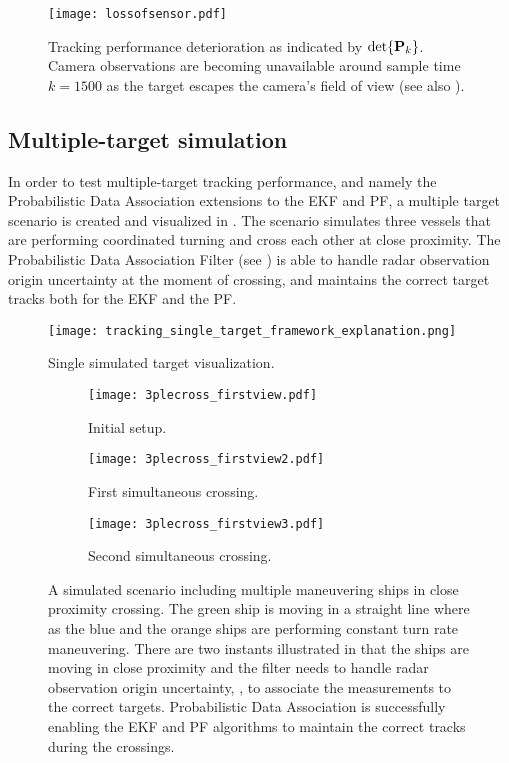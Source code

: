 \begin{figure}
	\centering
	\texttt{[image: lossofsensor.pdf]}
	\caption{Tracking performance deterioration as indicated by $\det{\P_k}$. Camera observations are becoming unavailable around sample time $k=1500$ as the target escapes the camera's field of view (see also ).}
	\label{fig:lossofcamera}
\end{figure}



\subsection{Multiple-target simulation}
In order to test multiple-target tracking performance, and namely the Probabilistic Data Association extensions to the EKF and PF, a multiple target scenario is created and visualized in . The scenario simulates three vessels that are performing coordinated turning and cross each other at close proximity. The Probabilistic Data Association Filter (see ) is able to handle radar observation origin uncertainty at the moment of crossing, and maintains the correct target tracks both for the EKF and the PF. 

\begin{figure}[H]
	\centering
	\texttt{[image: tracking\_single\_target\_framework\_explanation.png]}
	\caption{Single simulated target visualization.}
	\label{fig:simulatorsingle}
\end{figure}

\begin{figure}[H]
	\begin{subfigure}[b]{.5\textwidth}
		\centering
		\texttt{[image: 3plecross\_firstview.pdf]}
		\caption{Initial setup.}
		\label{fig:multiTrack1}
	\end{subfigure}\hfill
	\begin{subfigure}[b]{.5\textwidth}
		\centering
		\texttt{[image: 3plecross\_firstview2.pdf]}
		\caption{First simultaneous crossing.}
		\label{fig:multiTrack2}
	\end{subfigure}\hfill
	\begin{subfigure}[b]{1.0\textwidth}
		\centering
		\texttt{[image: 3plecross\_firstview3.pdf]}
		\caption{Second simultaneous crossing.}
		\label{fig:multiTrack3}
	\end{subfigure}\hfill
	\caption{A simulated scenario including multiple maneuvering ships in close proximity crossing. The green ship is moving in a straight line where as the blue and the orange ships are performing constant turn rate maneuvering. There are two instants illustrated in  that the ships are moving in close proximity and the filter needs to handle radar observation origin uncertainty, \ie, to associate the measurements to the correct targets. Probabilistic Data Association is successfully enabling the EKF and PF algorithms to maintain the correct tracks during the crossings.}
	\label{fig:multiTrack}
\end{figure}


